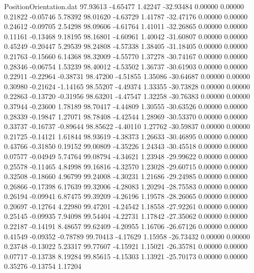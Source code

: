 \begin{filecontents}{PositionOrientation.dat}
  97.93613   -4.65477    1.42247   -32.93484    0.00000    0.00000    0.21822   -0.05746    5.78392
  98.01620   -4.63729    1.41787   -32.47176    0.00000    0.00000    0.24612   -0.09705    2.54298
  98.09606   -4.61764    1.41011   -32.26865    0.00000    0.00000    0.11161   -0.13468    9.18195
  98.16801   -4.60961    1.40042   -31.60807    0.00000    0.00000    0.45249   -0.20447    5.29539
  98.24808   -4.57338    1.38405   -31.18405    0.00000    0.00000    0.21763   -0.15660    6.14368
  98.32009   -4.55770    1.37278   -30.74167    0.00000    0.00000    0.28346   -0.06754    1.53239
  98.40012   -4.53502    1.36737   -30.61903    0.00000    0.00000    0.22911   -0.22964   -0.38731
  98.47200   -4.51855    1.35086   -30.64687    0.00000    0.00000    0.30980   -0.21624   -1.14165
  98.55207   -4.49374    1.33355   -30.73828    0.00000    0.00000    0.22863   -0.13720   -0.31956
  98.63201   -4.47547    1.32258   -30.76383    0.00000    0.00000    0.37944   -0.23600    1.78189
  98.70417   -4.44809    1.30555   -30.63526    0.00000    0.00000    0.28339   -0.19847    1.27071
  98.78408   -4.42544    1.28969   -30.53370    0.00000    0.00000    0.33737   -0.16737   -0.89644
  98.85622   -4.40110    1.27762   -30.59837    0.00000    0.00000    0.21725   -0.14121    1.61844
  98.93619   -4.38373    1.26633   -30.46895    0.00000    0.00000    0.43766   -0.31850    0.19152
  99.00809   -4.35226    1.24343   -30.45518    0.00000    0.00000    0.07577   -0.04949    5.74764
  99.08794   -4.34621    1.23948   -29.99622    0.00000    0.00000    0.25578   -0.11465    4.84998
  99.16816   -4.32570    1.23028   -29.60715    0.00000    0.00000    0.32508   -0.18660    4.96799
  99.24008   -4.30231    1.21686   -29.24985    0.00000    0.00000    0.26866   -0.17398    6.17639
  99.32006   -4.28083    1.20294   -28.75583    0.00000    0.00000    0.26194   -0.09941    6.87475
  99.39209   -4.26196    1.19578   -28.26065    0.00000    0.00000    0.20697   -0.12764    4.22980
  99.47201   -4.24542    1.18558   -27.92261    0.00000    0.00000    0.25145   -0.09935    7.94098
  99.54404   -4.22731    1.17842   -27.35062    0.00000    0.00000    0.22187   -0.14191    8.48657
  99.62409   -4.20955    1.16706   -26.67126    0.00000    0.00000    0.41549   -0.09352   -0.78789
  99.70413   -4.17629    1.15958   -26.73432    0.00000    0.00000    0.23748   -0.13022    5.23317
  99.77607   -4.15921    1.15021   -26.35781    0.00000    0.00000    0.07717   -0.13738    8.19284
  99.85615   -4.15303    1.13921   -25.70173    0.00000    0.00000    0.35276   -0.13754    1.17204

\end{filecontents}
